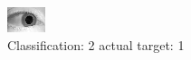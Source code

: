 \begin{figure}[h!]
\begin{center}
\includegraphics[width=0.60\columnwidth]{figures/ID1431_class_2_target_1.png}
\end{center}
\caption{ Classification: 2 actual target: 1}
\label{fig:ID1431_class_2_target_1}
\end{figure}
